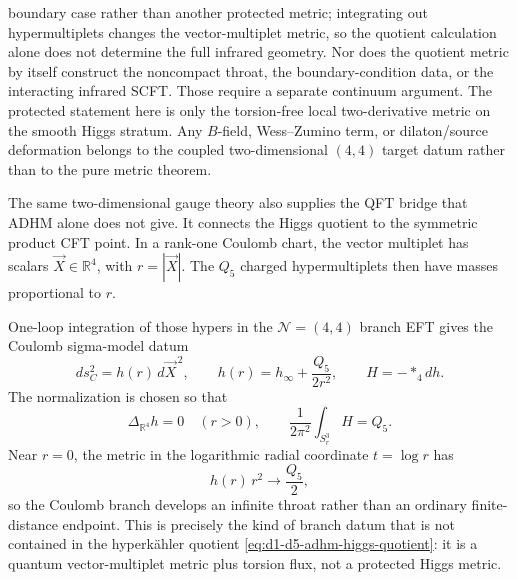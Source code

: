 \begin{example}[Two-dimensional \(\mathcal N=(4,4)\) ADHM Higgs branch]
boundary case rather than another protected metric; integrating out
hypermultiplets changes the vector-multiplet metric, so the quotient
calculation alone does not determine the full infrared geometry.
Nor does the quotient metric by itself construct the noncompact throat, the
boundary-condition data, or the interacting infrared SCFT.  Those require a
separate continuum argument.  The protected statement here is only the
torsion-free local two-derivative metric on the smooth Higgs stratum.  Any
\(B\)-field, Wess--Zumino term, or dilaton/source deformation belongs to the
coupled two-dimensional \((4,4)\) target datum rather than to the pure metric
theorem.
\end{example}

\begin{remark}
\label{rem:d1-d5-coulomb-throat-higgs-bridge}
The same two-dimensional gauge theory also supplies the QFT bridge that ADHM
alone does not give.  It connects the Higgs quotient to the symmetric product
CFT point.  In a rank-one Coulomb chart, the vector multiplet has scalars
\(\vec X\in\mathbb R^4\), with \(r=|\vec X|\).  The \(Q_5\) charged
hypermultiplets then have masses proportional to \(r\).

One-loop integration of those hypers in the \(\mathcal N=(4,4)\) branch EFT
gives the Coulomb sigma-model datum
\begin{equation}
  ds_C^2=h(r)\,d\vec X^{\,2},
  \qquad
  h(r)=h_\infty+\frac{Q_5}{2r^2},
  \qquad
  H=-\ast_4 dh .
  \label{eq:d1-d5-coulomb-throat-metric-flux}
\end{equation}
The normalization is chosen so that
\begin{equation}
  \Delta_{\mathbb R^4}h=0\quad (r>0),
  \qquad
  \frac{1}{2\pi^2}\int_{S_r^3}H=Q_5 .
  \label{eq:d1-d5-coulomb-hflux-quantization}
\end{equation}
Near \(r=0\), the metric in the logarithmic radial coordinate
\(t=\log r\) has
\[
  h(r)\,r^2\longrightarrow \frac{Q_5}{2},
\]
so the Coulomb branch develops an infinite throat rather than an ordinary
finite-distance endpoint.  This is precisely the kind of branch datum that is
not contained in the hyperk\"ahler quotient
\eqref{eq:d1-d5-adhm-higgs-quotient}: it is a quantum vector-multiplet metric
plus torsion flux, not a protected Higgs metric.


\end{remark}
